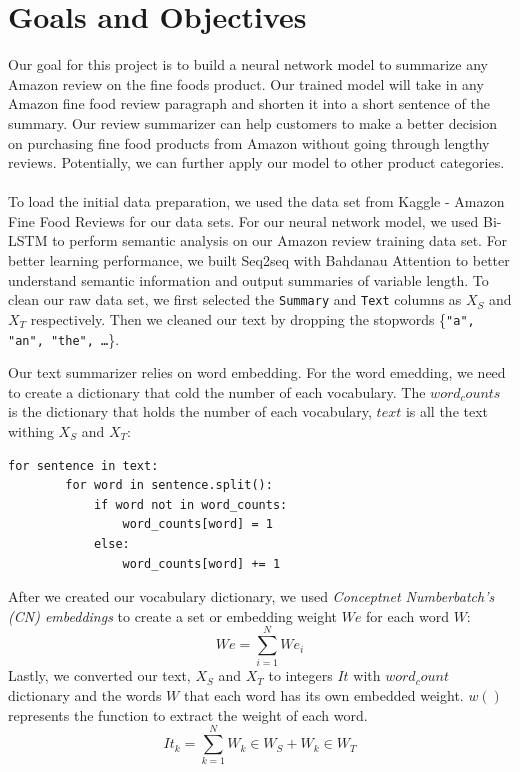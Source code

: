 \documentclass[conference]{IEEEtran}
\begin{document}
\section{Goals and Objectives}
Our goal for this project is to build a neural network model to summarize any Amazon review on the fine foods product. Our trained model will take in any Amazon fine food review paragraph and shorten it into a short sentence of the summary. Our review summarizer can help customers to make a better decision on purchasing fine food products from Amazon without going through lengthy reviews. Potentially, we can further apply our model to other product categories.\\\\
\indent To load the initial data preparation, we used the data set from Kaggle - Amazon Fine Food Reviews for our data sets. For our neural network model, we used Bi-LSTM to perform semantic analysis on our Amazon review training data set. For better learning performance, we built Seq2seq with Bahdanau Attention to better understand semantic information and output summaries of variable length.
\indent To clean our raw data set, we first selected the \texttt{Summary} and \texttt{Text} columns as $X_S$ and $X_T$ respectively. Then we cleaned our text by dropping the stopwords \{\texttt{"a", "an", "the", \ldots}\}.

\indent Our text summarizer relies on word embedding. For the word emedding, we need to create a dictionary that cold the number of each vocabulary. The $word_counts$ is the dictionary that holds the number of each vocabulary, $text$ is all the text withing $X_S$ and $X_T$:
\begin{lstlisting}
for sentence in text:
        for word in sentence.split():
            if word not in word_counts:
                word_counts[word] = 1
            else:
                word_counts[word] += 1
\end{lstlisting}

\indent After we created our vocabulary dictionary, we used \emph{Conceptnet Numberbatch's (CN) embeddings} to create a set or embedding weight $We$ for each word $W$:
\begin{equation}
    We = \sum_{i = 1}^{N} We_i
\end{equation}
\indent Lastly, we converted our text, $X_S$ and $X_T$ to integers $It$ with $word_count$ dictionary and the words $W$ that each word has its own embedded weight. $w()$ represents the function to extract the weight of each word.
\begin{equation}
    It_k = \sum_{k = 1}^{N}W_k \in W_S + W_k \in W_T
\end{equation}
\end{document}
